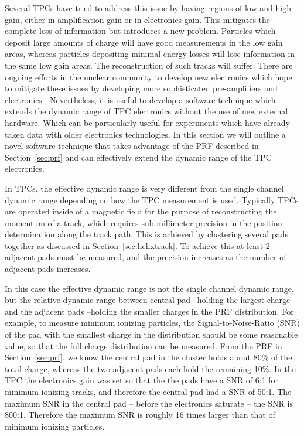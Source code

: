 Several TPCs have tried to address this issue by having regions of low and high gain, either in amplification gain or in electronics gain. This mitigates the complete loss of information but introduces a new problem. Particles which deposit large amounts of charge will have good measurements in the low gain areas, whereas particles depositing minimal energy losses will lose information in the same low gain areas. The reconstruction of such tracks will suffer. There are ongoing efforts in the nuclear community to develop new electronics which hope to mitigate these issues by developing more sophisticated  pre-amplifiers and electronics \cite{feanics,feanics2}.  Nevertheless, it is useful to develop a software technique which extends the dynamic range of TPC electronics without the use of new external hardware. Which can be particularly useful for experiments which have already taken data with older electronics technologies. In this section we will outline a novel software technique that takes advantage of the PRF described in Section~\ref{sec:prf} and can effectively extend the dynamic range of the TPC electronics. 

In TPCs, the effective dynamic range is very different from the single channel dynamic range depending on how the TPC measurement is used. Typically TPCs are operated inside of a magnetic field for the purpose of reconstructing the momentum of a track, which requires sub-millimeter precision in the position determination along the track path. This is achieved by clustering several pads together as discussed in Section~\ref{sec:helixtrack}. To achieve this at least 2 adjacent pads must be measured, and the precision increases as the number of adjacent pads increases. 

In this case the effective dynamic range is not the single channel dynamic range, but the relative dynamic range between central pad --holding the largest charge-- and the adjacent pads --holding the smaller charges in the PRF distribution. For example, to measure minimum ionizing particles, the Signal-to-Noise-Ratio (SNR) of the pad with the smallest charge in the distribution should be some reasonable value, so that the full charge distribution can be measured. From the PRF in Section~\ref{sec:prf}, we know the central pad in the cluster holds about 80\% of the total charge, whereas the two adjacent pads each hold the remaining 10\%. In the \spirit TPC the electronics gain was set so that the the pads have a SNR of 6:1 for minimum ionizing tracks, and therefore the central pad had a SNR of 50:1. The maximum SNR in the central pad -- before the electronics saturate -- the SNR is 800:1. Therefore the maximum SNR is roughly 16 times larger than that of minimum ionizing particles. 


